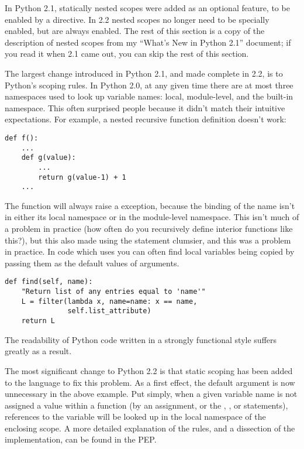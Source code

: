 \documentclass{howto}
\begin{document}
In Python 2.1, statically nested scopes were added as an optional
feature, to be enabled by a  directive.  In 2.2 nested scopes no longer need to be
specially enabled, but are always enabled.  The rest of this section
is a copy of the description of nested scopes from my ``What's New in
Python 2.1'' document; if you read it when 2.1 came out, you can skip
the rest of this section.

The largest change introduced in Python 2.1, and made complete in 2.2,
is to Python's scoping rules.  In Python 2.0, at any given time there
are at most three namespaces used to look up variable names: local,
module-level, and the built-in namespace.  This often surprised people
because it didn't match their intuitive expectations.  For example, a
nested recursive function definition doesn't work:

\begin{verbatim}
def f():
    ...
    def g(value):
        ...
        return g(value-1) + 1
    ...
\end{verbatim}

The function  will always raise a 
exception, because the binding of the name  isn't in either
its local namespace or in the module-level namespace.  This isn't much
of a problem in practice (how often do you recursively define interior
functions like this?), but this also made using the 
statement clumsier, and this was a problem in practice.  In code which
uses  you can often find local variables being copied
by passing them as the default values of arguments.

\begin{verbatim}
def find(self, name):
    "Return list of any entries equal to 'name'"
    L = filter(lambda x, name=name: x == name,
               self.list_attribute)
    return L
\end{verbatim}

The readability of Python code written in a strongly functional style
suffers greatly as a result.

The most significant change to Python 2.2 is that static scoping has
been added to the language to fix this problem.  As a first effect,
the  default argument is now unnecessary in the above
example.  Put simply, when a given variable name is not assigned a
value within a function (by an assignment, or the ,
, or  statements), references to the
variable will be looked up in the local namespace of the enclosing
scope.  A more detailed explanation of the rules, and a dissection of
the implementation, can be found in the PEP.
\end{document}
